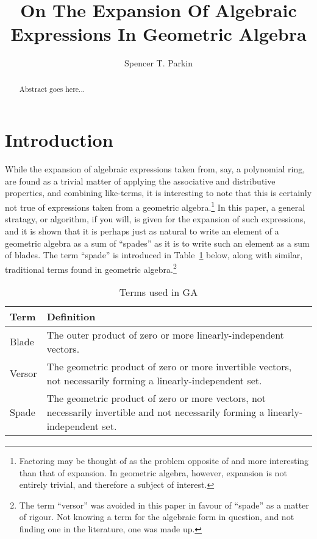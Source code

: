 \documentclass{birkjour}
\theoremstyle{definition}
\theoremstyle{remark}
\numberwithin{equation}{section}
\begin{document}
\title{On The Expansion Of Algebraic Expressions In Geometric Algebra}

\author{Spencer T. Parkin}



\begin{abstract}
Abstract goes here...
\end{abstract}


\maketitle

\section{Introduction}

While the expansion of algebraic expressions taken from, say, a polynomial ring, are found as a trivial matter
of applying the associative and distributive properties, and combining like-terms, it is interesting to note
that this is certainly not true of expressions taken from a geometric algebra.\footnote{Factoring may be thought of as the problem opposite of and more
interesting than that of expansion.  In geometric algebra, however, expansion is not entirely trivial, and therefore a subject of interest.}
In this paper, a general stratagy, or algorithm, if you will, is given for the expansion of such expressions, and it is shown that
it is perhaps just as natural to write an element of a geometric algebra as a sum of ``spades'' as it is to
write such an element as a sum of blades.  The term ``spade'' is introduced in Table~\ref{tbl_terms} below,
along with similar, traditional terms found in geometric algebra.\footnote{The term ``versor'' was avoided in
this paper in favour of ``spade'' as a matter of rigour.  Not knowing a term for the algebraic form in question, and not finding
one in the literature, one was made up.}

\begin{table}[H]\label{tbl_terms}\caption{Terms used in GA}
\begin{tabular}{p{1cm}p{9cm}}
Term & Definition \\
\hline
Blade & The outer product of zero or more linearly-independent vectors. \\
Versor & The geometric product of zero or more invertible vectors, not necessarily forming a linearly-independent set. \\
Spade & The geometric product of zero or more vectors, not necessarily invertible and not necessarily forming a linearly-independent set.
\end{tabular}
\end{table}
\end{document}

